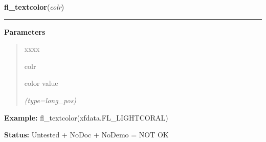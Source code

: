 \hspace{.8\funcindent}\begin{boxedminipage}{\funcwidth}

    \raggedright \textbf{fl\_textcolor}(\textit{colr})

    \vspace{-1.5ex}

    \rule{\textwidth}{0.5\fboxrule}
\setlength{\parskip}{2ex}
\setlength{\parskip}{1ex}
      \textbf{Parameters}
      \vspace{-1ex}

      \begin{quote}
        \begin{Ventry}{xxxx}

          \item[colr]

          color value

            {\it (type=long\_pos)}

        \end{Ventry}

      \end{quote}

\textbf{Example:} fl\_textcolor(xfdata.FL\_LIGHTCORAL)



\textbf{Status:} Untested + NoDoc + NoDemo = NOT OK



    \end{boxedminipage}

    \label{xformslib:flbasic:fl_bk_textcolor}

    \vspace{0.5ex}

